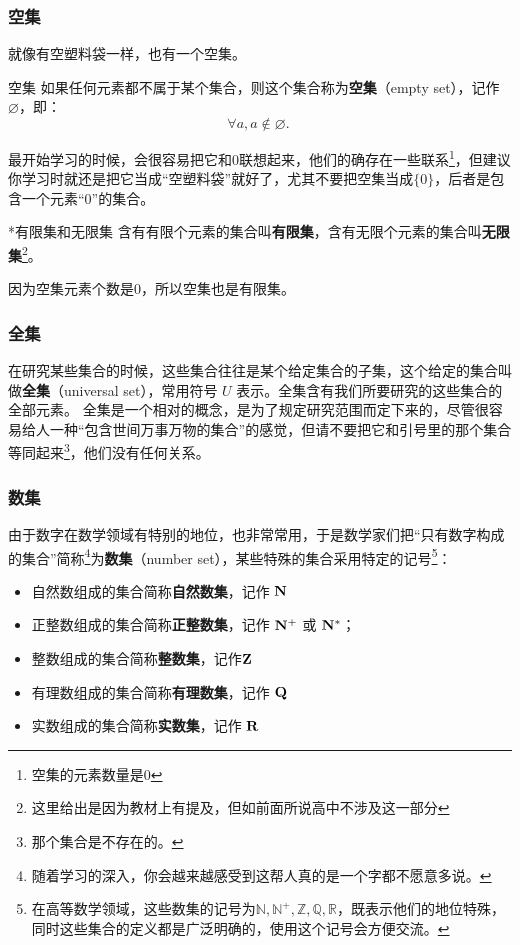 \subsubsection{空集}

就像有空塑料袋一样，也有一个空集。

\begin{definition}{空集}
如果任何元素都不属于某个集合，则这个集合称为\textbf{空集}（empty set），记作 $\varnothing$，即：
\begin{equation}
\forall a,a\notin\varnothing.~
\end{equation}
\end{definition}

最开始学习的时候，会很容易把它和$0$联想起来，他们的确存在一些联系\footnote{空集的元素数量是0}，但建议你学习时就还是把它当成“空塑料袋”就好了，尤其不要把空集当成$\{0\}$，后者是包含一个元素“$0$”的集合。

\begin{definition}{*有限集和无限集}
含有有限个元素的集合叫\textbf{有限集}，含有无限个元素的集合叫\textbf{无限集}\footnote{这里给出是因为教材上有提及，但如前面所说高中不涉及这一部分}。
\end{definition}

因为空集元素个数是0，所以空集也是有限集。

\subsubsection{全集}

在研究某些集合的时候，这些集合往往是某个给定集合的子集，这个给定的集合叫做\textbf{全集}（universal set），常用符号 $U$ 表示。全集含有我们所要研究的这些集合的全部元素。
全集是一个相对的概念，是为了规定研究范围而定下来的，尽管很容易给人一种“包含世间万事万物的集合”的感觉，但请不要把它和引号里的那个集合等同起来\footnote{那个集合是不存在的。}，他们没有任何关系。

\subsubsection{数集}

由于数字在数学领域有特别的地位，也非常常用，于是数学家们把“只有数字构成的集合”简称\footnote{随着学习的深入，你会越来越感受到这帮人真的是一个字都不愿意多说。}为\textbf{数集}（number set），某些特殊的集合采用特定的记号\footnote{在高等数学领域，这些数集的记号为$\mathbb{N,N^+,Z,Q,R}$，既表示他们的地位特殊，同时这些集合的定义都是广泛明确的，使用这个记号会方便交流。}：
\begin{itemize}
\item 自然数组成的集合简称\textbf{自然数集}，记作 ${\rm \mathbf{N}}$
\item 正整数组成的集合简称\textbf{正整数集}，记作 ${\rm \mathbf{N^+}}$ 或 ${\rm \mathbf{N^*}}$； 
\item 整数组成的集合简称\textbf{整数集}，记作${\rm \mathbf{Z}}$
\item 有理数组成的集合简称\textbf{有理数集}，记作 ${\rm \mathbf{Q}}$
\item 实数组成的集合简称\textbf{实数集}，记作 ${\rm \mathbf{R}}$
\end{itemize}


